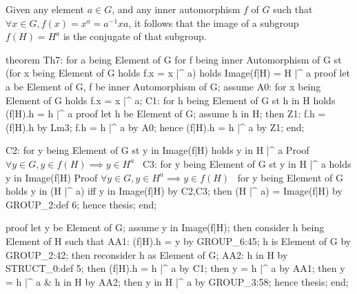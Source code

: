 \nwendcode{}\nwdocspar

Given any element $a\in G$, and any inner automorphism $f$ of $G$ such
that $\forall x\in G, f(x) = x^{a} = a^{-1}xa$, it follows that the
image of a subgroup $f(H) = H^{a}$ is the conjugate of that subgroup.

\nwenddocs{}\endmoddef\nwstartdeflinemarkup{}\nwenddeflinemarkup
theorem Th7:
  for a being Element of G
  for f being inner Automorphism of G
  st (for x being Element of G holds f.x = x |^ a)
  holds Image(f|H) = H |^ a
proof
  let a be Element of G,
      f be inner Automorphism of G;
  assume
A0: for x being Element of G holds f.x = x |^ a;
C1: for h being Element of G st h in H holds (f|H).h = h |^ a
  proof
    let h be Element of G;
    assume h in H;
    then Z1: f.h = (f|H).h by Lm3;
    f.h = h |^ a by A0;
    hence (f|H).h = h |^ a by Z1;
  end;

C2: for y being Element of G st y in Image(f|H) holds y in H |^ a
  \LA{}Proof $\forall y\in G, y\in f(H)\implies y\in H^{a}$~{\nwtagstyle{}}\RA{}
C3: for y being Element of G st y in H |^ a holds y in Image(f|H)
  \LA{}Proof $\forall y\in G, y \in H^{a}\implies y\in f(H)$~{\nwtagstyle{}}\RA{}
  for y being Element of G holds y in (H |^ a) iff y in Image(f|H) by C2,C3;
  then (H |^ a) = Image(f|H) by GROUP_2:def 6;
  hence thesis;
end;
  
\nwendcode{}\nwdocspar

\nwenddocs{}\endmoddef\nwstartdeflinemarkup{}\nwenddeflinemarkup
proof
  let y be Element of G;
  assume y in Image(f|H);
  then consider h being Element of H such that
  AA1: (f|H).h = y by GROUP_6:45;
  h is Element of G by GROUP_2:42;
  then reconsider h as Element of G;
  AA2: h in H by STRUCT_0:def 5;
  then (f|H).h = h |^ a by C1;
  then y = h |^ a by AA1;
  then y = h |^ a & h in H by AA2; 
  then y in H |^ a by GROUP_3:58;
  hence thesis;
end;
    
